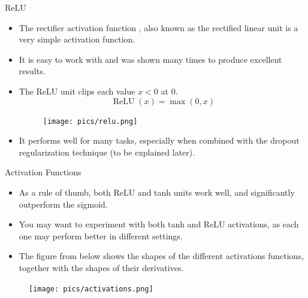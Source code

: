 \documentclass[handout]{beamer}
\begin{document}
\begin{frame}{ReLU}
\begin{scriptsize}
\begin{itemize}
\item The rectifier activation function \cite{glorot2011deep}, also known as the rectified linear unit is a very simple activation function.
\item It is easy to work with and was shown many times to produce excellent results.
\item The ReLU unit clips each value $x < 0$ at $0$.
\begin{displaymath}
 \operatorname{ReLU}(x) = \operatorname{max}(0,x)
\end{displaymath}
\begin{figure}[htb]
	\centering
	 \texttt{[image: pics/relu.png]}
\end{figure}
\item It performs well for many tasks, especially when combined with the dropout regularization technique (to be explained later).
\end{itemize}
\end{scriptsize}
\end{frame}



\begin{frame}{Activation Functions}
\begin{scriptsize}
\begin{itemize}
\item As a rule of thumb, both ReLU and tanh units work well, and significantly outperform the sigmoid.
\item You may want to experiment with both tanh and ReLU activations, as each one may perform better in different settings.
\item The figure from below shows the shapes of the different activations functions, together with the shapes of their derivatives.
\end{itemize}
\begin{figure}[htb]
	\centering
	 \texttt{[image: pics/activations.png]}
\end{figure}

\end{scriptsize}
\end{frame}
\end{document}
